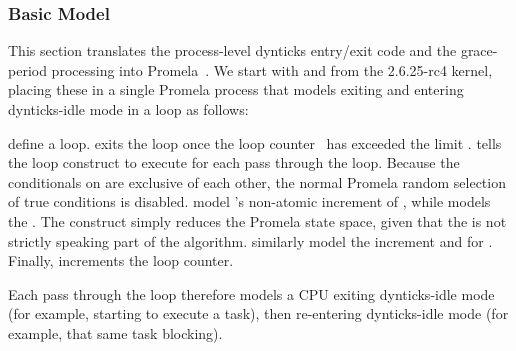 \subsubsection{Basic Model}
\label{sec:formal:Basic Model}

This section translates the process-level dynticks entry/exit
code and the grace-period processing into
Promela~\cite{Holzmann03a}.
We start with  and
from the 2.6.25-rc4 kernel, placing these in a single Promela
process that models exiting and entering dynticks-idle mode in
a loop as follows:



\begin{fcvref}
 define a loop.
 exits the loop once the loop counter~
has exceeded the limit .
 tells the loop construct to execute
for each pass through the loop.
Because the conditionals on 
are exclusive of
each other, the normal Promela random selection of true conditions
is disabled.
 model
's non-atomic
increment of , while
 models the .
The  construct simply reduces the Promela state space,
given that the  is not strictly speaking part
of the algorithm.
 similarly model the increment and
 for .
Finally,  increments the loop counter.
\end{fcvref}

Each pass through the loop therefore models a CPU exiting
dynticks-idle mode (for example, starting to execute a task), then
re-entering dynticks-idle mode (for example, that same task blocking).


